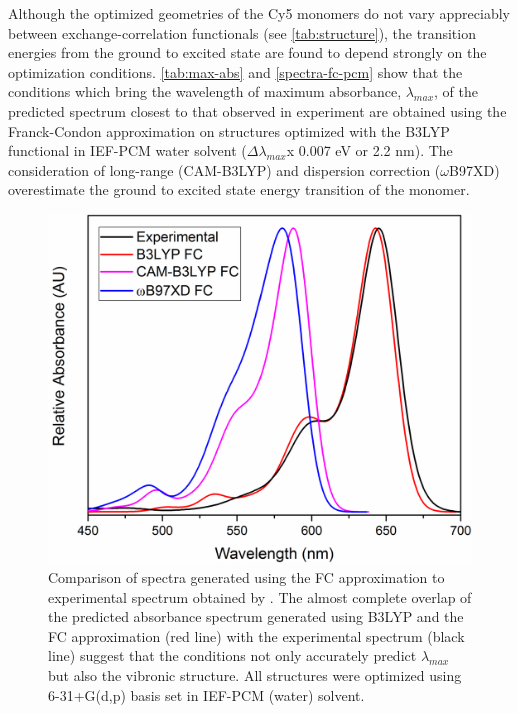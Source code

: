 Although the optimized geometries of the Cy5 monomers do not vary appreciably between exchange-correlation functionals (see \autoref{tab:structure}), the transition energies from the ground to excited state are found to depend strongly on the optimization conditions. \autoref{tab:max-abs} and \autoref{spectra-fc-pcm} show that the conditions which bring the wavelength of maximum absorbance, $\lambda_{max}$, of the predicted spectrum closest to that observed in experiment are obtained using the Franck-Condon approximation on structures optimized with the B3LYP functional in IEF-PCM water solvent ($\Delta\lambda_{max}$x 0.007 eV or 2.2 nm). The consideration of long-range (CAM-B3LYP) and dispersion correction ($\omega$B97XD) overestimate the ground to excited state energy transition of the monomer. 
\begin{figure}[h!]
    \centering
    \includegraphics[width=0.8\linewidth]{figures/pub1/FC-PCM.pdf}
    \caption[Comparison of spectra generated using the FC approximation to experimental spectrum obtained by Cannon. The almost complete overlap of the predicted absorbance spectrum generated using B3LYP and the FC approximation (red line) with the experimental spectrum (black line) suggest that the conditions not only accurately predict $\lambda_{max}$ but also the vibronic structure. All structures were optimized using 6-31+G(d,p) basis set in IEF-PCM (water) solvent.]{Comparison of spectra generated using the FC approximation to experimental spectrum obtained by \cite{Cannon2017}. The almost complete overlap of the predicted absorbance spectrum generated using B3LYP and the FC approximation (red line) with the experimental spectrum (black line) suggest that the conditions not only accurately predict $\lambda_{max}$ but also the vibronic structure. All structures were optimized using 6-31+G(d,p) basis set in IEF-PCM (water) solvent.}\label{spectra-fc-pcm}
\end{figure}

